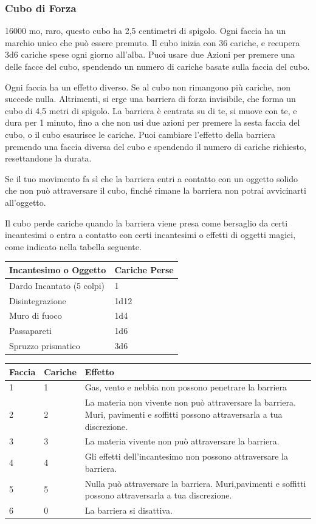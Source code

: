 \begin{multicols}{2}
\subsubsection*{Cubo di Forza}
16000 mo, raro, questo cubo ha 2,5 centimetri di spigolo. Ogni faccia ha un marchio unico che può essere premuto. Il cubo inizia con 36 cariche, e recupera 3d6 cariche spese ogni giorno all'alba. Puoi usare due Azioni per premere una delle facce del cubo, spendendo un numero di cariche basate sulla faccia del cubo.

Ogni faccia ha un effetto diverso. Se al cubo non rimangono più cariche, non succede nulla. Altrimenti, si erge una barriera di forza invisibile, che forma un cubo di 4,5 metri di spigolo. La barriera è centrata su di te, si muove con te, e dura per 1 minuto, fino a che non usi due azioni per premere la sesta faccia del cubo, o il cubo esaurisce le cariche. Puoi cambiare l'effetto della barriera premendo una faccia diversa del cubo e spendendo il numero di cariche richiesto, resettandone la durata.

Se il tuo movimento fa sì che la barriera entri a contatto con un oggetto solido che non può attraversare il cubo, finché rimane la barriera non potrai avvicinarti all'oggetto.

\medskip

Il cubo perde cariche quando la barriera viene presa come bersaglio da certi incantesimi o entra a contatto con certi incantesimi o effetti di oggetti magici, come indicato nella tabella seguente.

\medskip

\begin{tabular}{ll}
\textbf{Incantesimo o Oggetto} &\textbf{Cariche Perse}\\
\hline
Dardo Incantato (5 colpi) &1\\
Disintegrazione &1d12\\
Muro di fuoco &1d4\\
Passapareti& 1d6\\
Spruzzo prismatico &3d6\\
\end{tabular}

\medskip

\begin{tabularx}{0.45\textwidth}{llX}
\textbf{Faccia} & \textbf{Cariche}& \textbf{Effetto}\\
\hline
1& 1& Gas, vento e nebbia non possono penetrare la barriera\\
2& 2 &La materia non vivente non può attraversare la barriera. Muri, pavimenti e soffitti possono attraversarla a tua discrezione.\\
3 &3 &La materia vivente non può attraversare la barriera.\\
4 &4 &Gli effetti dell'incantesimo non possono attraversare la barriera.\\
5 &5 &Nulla può attraversare la barriera. Muri,pavimenti e soffitti possono attraversarla a tua discrezione.\\
6 &0& La barriera si disattiva. \\
\end{tabularx}



\end{multicols}
